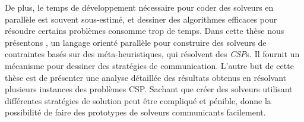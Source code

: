 De plus, le temps de d\'eveloppement n\'ecessaire pour coder des solveurs en parall\`ele est souvent sous-estim\'e, et dessiner des algorithmes efficaces pour r\'esoudre certains probl\`emes consomme trop de temps. Dans cette thèse nous présentons \posl{}, un langage orient\'e parall\`ele pour construire des solveurs de contraintes bas\'es sur des m\'eta-heuristiques, qui r\'esolvent des {\it CSP}s. Il fournit un m\'ecanisme pour dessiner des stratégies de communication. L'autre but de cette thèse est de présenter une analyse d\'etaill\'ee des r\'esultats obtenus en r\'esolvant plusieurs instances des probl\`emes CSP. Sachant que cr\'eer des solveurs utilisant diff\'erentes strat\'egies de solution peut être compliqu\'e et p\'enible, \posl{} donne la possibilit\'e de faire des prototypes de solveurs communicants facilement.